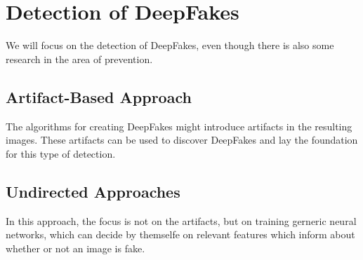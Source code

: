 \section{Detection of DeepFakes}
We will focus on the detection of DeepFakes, even though there is also some research in the area of
prevention.

\subsection{Artifact-Based Approach}
The algorithms for creating DeepFakes might introduce artifacts in the resulting images.
These artifacts can be used to discover DeepFakes and lay the foundation for this type of detection.

\subsection{Undirected Approaches}
In this approach, the focus is not on the artifacts, but on training gerneric neural networks, which can decide by themselfe on relevant
features which inform about whether or not an image is fake.